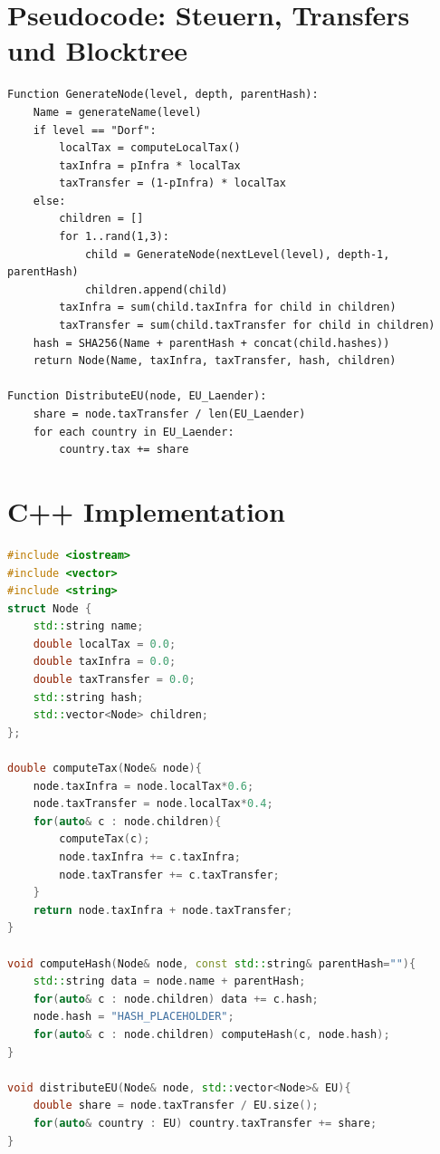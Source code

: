 \documentclass[a4paper,12pt]{article}
\begin{document}
\section{Pseudocode: Steuern, Transfers und Blocktree}
\begin{verbatim}
Function GenerateNode(level, depth, parentHash):
    Name = generateName(level)
    if level == "Dorf":
        localTax = computeLocalTax()
        taxInfra = pInfra * localTax
        taxTransfer = (1-pInfra) * localTax
    else:
        children = []
        for 1..rand(1,3):
            child = GenerateNode(nextLevel(level), depth-1, parentHash)
            children.append(child)
        taxInfra = sum(child.taxInfra for child in children)
        taxTransfer = sum(child.taxTransfer for child in children)
    hash = SHA256(Name + parentHash + concat(child.hashes))
    return Node(Name, taxInfra, taxTransfer, hash, children)

Function DistributeEU(node, EU_Laender):
    share = node.taxTransfer / len(EU_Laender)
    for each country in EU_Laender:
        country.tax += share
\end{verbatim}

\section{C++ Implementation}
\begin{lstlisting}[language=C++]
#include <iostream>
#include <vector>
#include <string>
struct Node {
    std::string name;
    double localTax = 0.0;
    double taxInfra = 0.0;
    double taxTransfer = 0.0;
    std::string hash;
    std::vector<Node> children;
};

double computeTax(Node& node){
    node.taxInfra = node.localTax*0.6;
    node.taxTransfer = node.localTax*0.4;
    for(auto& c : node.children){
        computeTax(c);
        node.taxInfra += c.taxInfra;
        node.taxTransfer += c.taxTransfer;
    }
    return node.taxInfra + node.taxTransfer;
}

void computeHash(Node& node, const std::string& parentHash=""){
    std::string data = node.name + parentHash;
    for(auto& c : node.children) data += c.hash;
    node.hash = "HASH_PLACEHOLDER";
    for(auto& c : node.children) computeHash(c, node.hash);
}

void distributeEU(Node& node, std::vector<Node>& EU){
    double share = node.taxTransfer / EU.size();
    for(auto& country : EU) country.taxTransfer += share;
}
\end{lstlisting}
\end{document}
